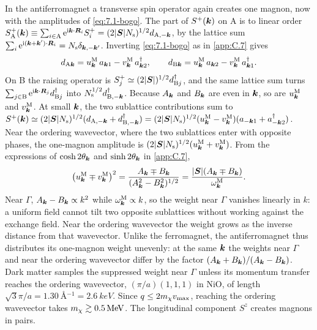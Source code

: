 In the antiferromagnet a transverse spin operator again creates one magnon, now with the amplitudes of \cref{eq:7.1-bogo}. The part of $S^+(\bm{k})$ on A is to linear order $S^+_{\mathrm{A}}(\bm{k}) \equiv \sum_{i\in\mathrm{A}}\mathrm{e}^{\mathrm{i}\bm{k}\cdot\bm{R}_i}S^+_i = (2|\bm{S}|N_{\mathrm{s}})^{1/2}d_{\mathrm{A},-\bm{k}}$, by the lattice sum $\sum_i\mathrm{e}^{\mathrm{i}(\bm{k}+\bm{k}')\cdot\bm{R}_i} = N_{\mathrm{s}}\delta_{\bm{k},-\bm{k}'}$. Inverting \cref{eq:7.1-bogo} as in \cref{app:C.7} gives
\begin{equation}
  d_{\mathrm{A}\bm{k}} = u^{\mathrm{M}}_{\bm{k}}\,a_{\bm{k}1} - v^{\mathrm{M}}_{\bm{k}}\,a^\dagger_{\bm{k}2}, \qquad
  d_{\mathrm{B}\bm{k}} = u^{\mathrm{M}}_{\bm{k}}\,a_{\bm{k}2} - v^{\mathrm{M}}_{\bm{k}}\,a^\dagger_{\bm{k}1} .
  \label{eq:D.19-inverse}
\end{equation}
On B the raising operator is $S^+_j \simeq (2|\bm{S}|)^{1/2}d^\dagger_{\mathrm{B}j}$, and the same lattice sum turns $\sum_{j\in\mathrm{B}}\mathrm{e}^{\mathrm{i}\bm{k}\cdot\bm{R}_j}d^\dagger_{\mathrm{B}j}$ into $N_{\mathrm{s}}^{1/2}d^\dagger_{\mathrm{B},-\bm{k}}$. Because $A_{\bm{k}}$ and $B_{\bm{k}}$ are even in $\bm{k}$, so are $u^{\mathrm{M}}_{\bm{k}}$ and $v^{\mathrm{M}}_{\bm{k}}$. At small $\bm{k}$, the two sublattice contributions sum to $S^+(\bm{k}) \simeq (2|\bm{S}|N_{\mathrm{s}})^{1/2}(d_{\mathrm{A},-\bm{k}} + d^\dagger_{\mathrm{B},-\bm{k}}) = (2|\bm{S}|N_{\mathrm{s}})^{1/2}(u^{\mathrm{M}}_{\bm{k}} - v^{\mathrm{M}}_{\bm{k}})(a_{-\bm{k}1} + a^\dagger_{-\bm{k}2})$. Near the ordering wavevector, where the two sublattices enter with opposite phases, the one-magnon amplitude is $(2|\bm{S}|N_{\mathrm{s}})^{1/2}(u^{\mathrm{M}}_{\bm{k}} + v^{\mathrm{M}}_{\bm{k}})$. From the expressions of $\cosh2\theta_{\bm{k}}$ and $\sinh2\theta_{\bm{k}}$ in \cref{app:C.7},
\begin{equation}
  \bigl(u^{\mathrm{M}}_{\bm{k}} \mp v^{\mathrm{M}}_{\bm{k}}\bigr)^2 = \frac{A_{\bm{k}} \mp B_{\bm{k}}}{(A_{\bm{k}}^2 - B_{\bm{k}}^2)^{1/2}} = \frac{|\bm{S}|(A_{\bm{k}} \mp B_{\bm{k}})}{\omega^{\mathrm{M}}_{\bm{k}}} .
  \label{eq:7.1-weights}
\end{equation}
Near $\Gamma$, $A_{\bm{k}} - B_{\bm{k}} \propto k^2$ while $\omega^{\mathrm{M}}_{\bm{k}} \propto k$, so the weight near $\Gamma$ vanishes linearly in $k$: a uniform field cannot tilt two opposite sublattices without working against the exchange field. Near the ordering wavevector the weight grows as the inverse distance from that wavevector. Unlike the ferromagnet, the antiferromagnet thus distributes its one-magnon weight unevenly: at the same $\bm{k}$ the weights near $\Gamma$ and near the ordering wavevector differ by the factor $(A_{\bm{k}} + B_{\bm{k}})/(A_{\bm{k}} - B_{\bm{k}})$. Dark matter samples the suppressed weight near $\Gamma$ unless its momentum transfer reaches the ordering wavevector, $(\pi/a)(1,1,1)$ in NiO, of length $\sqrt3\pi/a = \SI{1.30}{\angstrom^{-1}} = \SI{2.6}{keV}$. Since $q \le 2m_{\chi} v_{\mathrm{max}}$, reaching the ordering wavevector takes $m_{\chi} \gtrsim \SI{0.5}{MeV}$. The longitudinal component $S^z$ creates magnons in pairs.
